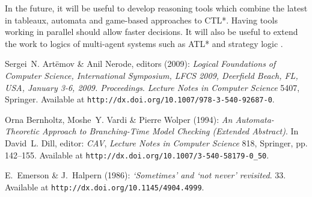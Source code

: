 \documentclass[submission,copyright,creativecommons]{eptcs}
\begin{document}
In the future, 
it will be useful to develop reasoning tools which combine
the latest 
in tableaux, automata and game-based
approaches to CTL*.
Having tools working in parallel should allow faster decisions.
It will also be useful to extend the work to 
logics of multi-agent systems such as ATL* 
and strategy logic \cite{DBLP:conf/concur/MogaveroMPV12}.




\begin{thebibliography}{10}
\providecommand{\bibitemdeclare}[2]{}
\providecommand{\surnamestart}{}
\providecommand{\surnameend}{}
\providecommand{\urlprefix}{Available at }
\providecommand{\url}[1]{\texttt{#1}}
\providecommand{\href}[2]{\texttt{#2}}
\providecommand{\urlalt}[2]{\href{#1}{#2}}
\providecommand{\doi}[1]{doi:\urlalt{http://dx.doi.org/#1}{#1}}
\providecommand{\bibinfo}[2]{#2}

\bibitemdeclare{proceedings}{DBLP:conf/lfcs/2009}
\bibinfo{editor}{Sergei~N. \surnamestart Art{\"e}mov\surnameend} \&
  \bibinfo{editor}{Anil \surnamestart Nerode\surnameend}, editors
  (\bibinfo{year}{2009}): \emph{\bibinfo{title}{Logical Foundations of Computer
  Science, International Symposium, LFCS 2009, Deerfield Beach, FL, USA,
  January 3-6, 2009. Proceedings}}. {\sl \bibinfo{series}{Lecture Notes in
  Computer Science}} \bibinfo{volume}{5407}, \bibinfo{publisher}{Springer}.
\newblock \urlprefix\url{http://dx.doi.org/10.1007/978-3-540-92687-0}.

\bibitemdeclare{inproceedings}{DBLP:conf/cav/BernholtzVW94}
\bibinfo{author}{Orna \surnamestart Bernholtz\surnameend},
  \bibinfo{author}{Moshe~Y. \surnamestart Vardi\surnameend} \&
  \bibinfo{author}{Pierre \surnamestart Wolper\surnameend}
  (\bibinfo{year}{1994}): \emph{\bibinfo{title}{An Automata-Theoretic Approach
  to Branching-Time Model Checking (Extended Abstract)}}.
\newblock In \bibinfo{editor}{David~L. \surnamestart Dill\surnameend}, editor:
  {\sl \bibinfo{booktitle}{CAV}}, {\sl \bibinfo{series}{Lecture Notes in
  Computer Science}} \bibinfo{volume}{818}, \bibinfo{publisher}{Springer}, pp.
  \bibinfo{pages}{142--155}.
\newblock \urlprefix\url{http://dx.doi.org/10.1007/3-540-58179-0_50}.

\bibitemdeclare{article}{+emhal86}
\bibinfo{author}{E.~\surnamestart Emerson\surnameend} \&
  \bibinfo{author}{J.~\surnamestart Halpern\surnameend} (\bibinfo{year}{1986}):
  \emph{\bibinfo{title}{`{S}ometimes' and `not never' revisited}}.
\newblock {\sl \bibinfo{journal}{J. ACM}} \bibinfo{volume}{33}.
\newblock \urlprefix\url{http://dx.doi.org/10.1145/4904.4999}.


\end{thebibliography}
\end{document}

